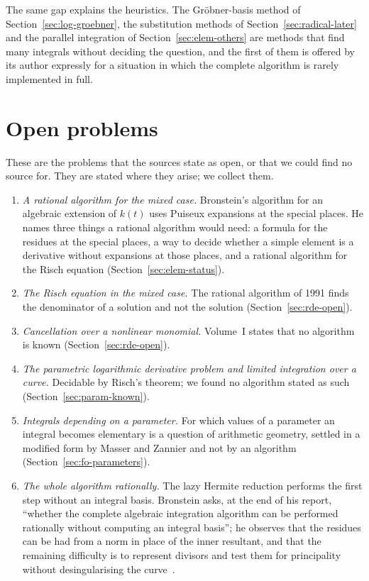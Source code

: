 The same gap explains the heuristics. The Gr\"obner-basis method of
Section~\ref{sec:log-groebner}, the substitution methods of
Section~\ref{sec:radical-later} and the parallel integration of
Section~\ref{sec:elem-others} are methods that find many integrals without deciding the question, and the
first of them is offered by its author expressly for a situation in which
the complete algorithm is rarely implemented in full.

\section{Open problems}\label{sec:impl-open}

These are the problems that the sources state as open, or that we could find
no source for. They are stated where they arise; we collect them.

\begin{enumerate}
\item \emph{A rational algorithm for the mixed case.} Bronstein's algorithm
  for an algebraic extension of $k(t)$ uses Puiseux expansions at the special
  places. He names three things a rational algorithm would need: a formula
  for the residues at the special places, a way to decide whether a simple
  element is a derivative without expansions at those places, and a rational
  algorithm for the Risch equation (Section~\ref{sec:elem-status}).
\item \emph{The Risch equation in the mixed case.} The rational algorithm
  of 1991 finds the denominator of a solution and not the solution
  (Section~\ref{sec:rde-open}).
\item \emph{Cancellation over a nonlinear monomial.} Volume~I states that no
  algorithm is known (Section~\ref{sec:rde-open}).
\item \emph{The parametric logarithmic derivative problem and limited
  integration over a curve.} Decidable by Risch's theorem; we found no
  algorithm stated as such (Section~\ref{sec:param-known}).
\item \emph{Integrals depending on a parameter.} For which values of a
  parameter an integral becomes elementary is a question of arithmetic
  geometry, settled in a modified form by Masser and Zannier and not by an
  algorithm (Section~\ref{sec:fo-parameters}).
\item \emph{The whole algorithm rationally.} The lazy Hermite reduction
  performs the first step without an integral basis. Bronstein asks, at the
  end of his report, ``whether the complete algebraic integration algorithm
  can be performed rationally without computing an integral basis''; he
  observes that the residues can be had from a norm in place of the inner
  resultant, and that the remaining difficulty is to represent divisors and
  test them for principality without desingularising the
  curve~\cite[Conclusions]{bronstein1998lazy}.
\end{enumerate}

